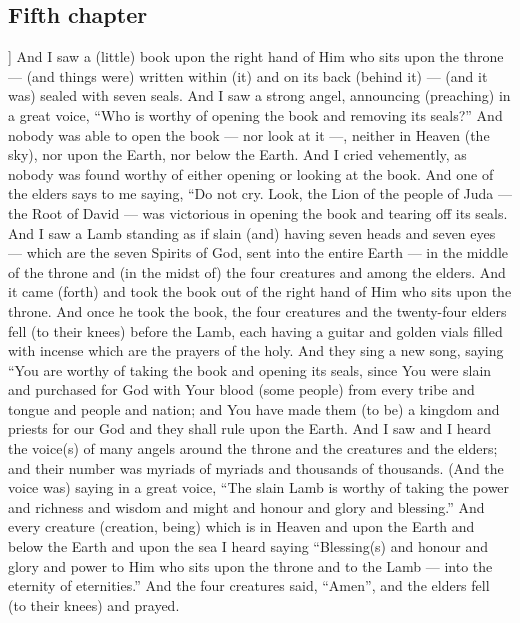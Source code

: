 \begin{pages}
\begin{Rightside}
        			\chapter*{Fifth chapter}
				]
		And I saw a (little) book upon the right hand of Him who sits upon the throne — (and things were) written within (it) and on its back (behind it) — (and it was) sealed with seven seals. And I saw a strong angel, announcing (preaching) in a great voice, “Who is worthy of opening the book and removing its seals?” And nobody was able to open the book — nor look at it —, neither in Heaven (the sky), nor upon the Earth, nor below the Earth. And I cried vehemently, as nobody was found worthy of either opening or looking at the book.
		\pend
		\pstart
		And one of the elders says to me saying, “Do not cry. Look, the Lion of the people of Juda — the Root of David — was victorious in opening the book and tearing off its seals. And I saw a Lamb standing as if slain (and) having seven heads and seven eyes — which are the seven Spirits of God, sent into the entire Earth — in the middle of the throne and (in the midst of) the four creatures and among the elders. And it came (forth) and took the book out of the right hand of Him who sits upon the throne.
		\pend
		\pstart
		And once he took the book, the four creatures and the twenty-four elders fell (to their knees) before the Lamb, each having a guitar and golden vials filled with incense which are the prayers of the holy. And they sing a new song, saying “You are worthy of taking the book and opening its seals, since You were slain and purchased for God with Your blood (some people) from every tribe and tongue and people and nation; and You have made them (to be) a kingdom and priests for our God and they shall rule upon the Earth. 
		\pend
		\pstart
		And I saw and I heard the voice(s) of many angels around the throne and the creatures and the elders; and their number was myriads of myriads and thousands of thousands. (And the voice was) saying in a great voice, “The slain Lamb is worthy of taking the power and richness and wisdom and might and honour and glory and blessing.” And every creature (creation, being) which is in Heaven and upon the Earth and below the Earth and upon the sea I heard saying “Blessing(s) and honour and glory and power to Him who sits upon the throne and to the Lamb — into the eternity of eternities.” And the four creatures said, “Amen”, and the elders fell (to their knees) and prayed.
		\pend
        \endnumbering
    \end{Rightside}

\end{pages} 
\Pages